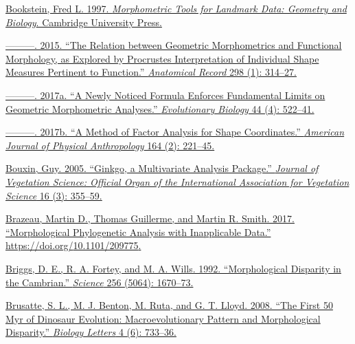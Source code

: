 \href{http://paperpile.com/b/sTGYvp/1SD2}{Bookstein, Fred L. 1997.
}\href{http://paperpile.com/b/sTGYvp/1SD2}{\emph{Morphometric Tools for
Landmark Data: Geometry and
Biology}}\href{http://paperpile.com/b/sTGYvp/1SD2}{. Cambridge
University Press.}

\href{http://paperpile.com/b/sTGYvp/sN5d}{---------. 2015. ``The
Relation between Geometric Morphometrics and Functional Morphology, as
Explored by Procrustes Interpretation of Individual Shape Measures
Pertinent to Function.''
}\href{http://paperpile.com/b/sTGYvp/sN5d}{\emph{Anatomical Record
}}\href{http://paperpile.com/b/sTGYvp/sN5d}{ 298 (1): 314--27.}

\href{http://paperpile.com/b/sTGYvp/o4w7}{---------. 2017a. ``A Newly
Noticed Formula Enforces Fundamental Limits on Geometric Morphometric
Analyses.''
}\href{http://paperpile.com/b/sTGYvp/o4w7}{\emph{Evolutionary
Biology}}\href{http://paperpile.com/b/sTGYvp/o4w7}{ 44 (4): 522--41.}

\href{http://paperpile.com/b/sTGYvp/xaUx}{---------. 2017b. ``A Method
of Factor Analysis for Shape Coordinates.''
}\href{http://paperpile.com/b/sTGYvp/xaUx}{\emph{American Journal of
Physical Anthropology}}\href{http://paperpile.com/b/sTGYvp/xaUx}{ 164
(2): 221--45.}

\href{http://paperpile.com/b/sTGYvp/9JdS}{Bouxin, Guy. 2005. ``Ginkgo, a
Multivariate Analysis Package.''
}\href{http://paperpile.com/b/sTGYvp/9JdS}{\emph{Journal of Vegetation
Science: Official Organ of the International Association for Vegetation
Science}}\href{http://paperpile.com/b/sTGYvp/9JdS}{ 16 (3): 355--59.}

\href{http://paperpile.com/b/sTGYvp/Yrbg}{Brazeau, Martin D., Thomas
Guillerme, and Martin R. Smith. 2017. ``Morphological Phylogenetic
Analysis with Inapplicable Data.''
https://doi.org/}\href{http://dx.doi.org/10.1101/209775}{10.1101/209775}\href{http://paperpile.com/b/sTGYvp/Yrbg}{.}

\href{http://paperpile.com/b/sTGYvp/CiPy}{Briggs, D. E., R. A. Fortey,
and M. A. Wills. 1992. ``Morphological Disparity in the Cambrian.''
}\href{http://paperpile.com/b/sTGYvp/CiPy}{\emph{Science}}\href{http://paperpile.com/b/sTGYvp/CiPy}{
256 (5064): 1670--73.}

\href{http://paperpile.com/b/sTGYvp/tGyd}{Brusatte, S. L., M. J. Benton,
M. Ruta, and G. T. Lloyd. 2008. ``The First 50 Myr of Dinosaur
Evolution: Macroevolutionary Pattern and Morphological Disparity.''
}\href{http://paperpile.com/b/sTGYvp/tGyd}{\emph{Biology
Letters}}\href{http://paperpile.com/b/sTGYvp/tGyd}{ 4 (6): 733--36.}

